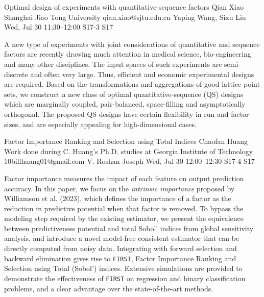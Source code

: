 \begin{talk}
  {Optimal design of experiments with quantitative-sequence factors}%
  {Qian Xiao}%
  {Shanghai Jiao Tong University}%
  {qian.xiao@sjtu.edu.cn}%
  {Yaping Wang, Sixu Liu}%
  {}%
  {Wed, Jul 30 11:30--12:00}%
  {S17-3}%
  {S17}%
  
    
   
A new type of experiments with joint considerations of quantitative and sequence factors are recently drawing much attention in medical science, bio-engineering and many other disciplines. The input spaces of such experiments are semi-discrete and often very large. Thus, efficient and economic experimental designs are required. Based on the transformations and aggregations of good lattice point sets, we construct a new class of optimal quantitative-sequence (QS) designs which are marginally coupled, pair-balanced, space-filling and asymptotically orthogonal. The proposed QS designs have certain flexibility in run and factor sizes, and are especially appealing for high-dimensional cases.

\end{talk}

\begin{talk}
  {Factor Importance Ranking and Selection using Total Indices}%
  {Chaofan Huang}%
  {Work done during C. Huang's Ph.D. studies at Georgia Institute of Technology}%
  {10billhuang01@gmail.com}%
  {V. Roshan Joseph}%
  {}%
  {Wed, Jul 30 12:00--12:30}%
  {S17-4}%
  {S17}%
  
    
   
Factor importance measures the impact of each feature on output prediction accuracy. In this paper, we focus on the \emph{intrinsic importance} proposed by Williamson et al. (2023), which defines the importance of a factor as the reduction in predictive potential when that factor is removed. To bypass the modeling step required by the existing estimator, we present the equivalence between predictiveness potential and total Sobol' indices from global sensitivity analysis, and introduce a novel model-free consistent estimator that can be directly computed from noisy data. Integrating with forward selection and backward elimination gives rise to \texttt{FIRST}, Factor Importance Ranking and Selection using Total (Sobol') indices. Extensive simulations are provided to demonstrate the effectiveness of \texttt{FIRST} on regression and binary classification problems, and a clear advantage over the state-of-the-art methods.
\end{talk}

